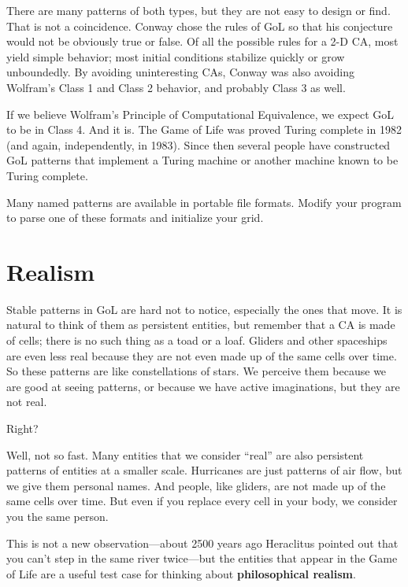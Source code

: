 \documentclass[10pt]{book}
\begin{document}
There are many patterns of both types, but they are not easy to
design or find.  That is not a coincidence.  Conway chose the
rules of GoL so that his conjecture would not be obviously
true or false.  Of all the possible rules for a 2-D CA, most
yield simple behavior; most initial conditions stabilize quickly
or grow unboundedly.  By avoiding uninteresting CAs, Conway
was also avoiding Wolfram's Class 1 and Class 2 behavior, and
probably Class 3 as well.

If we believe Wolfram's Principle of Computational Equivalence, we
expect GoL to be in Class 4.  And it is.  The Game of Life was proved
Turing complete in 1982 (and again, independently, in 1983).
Since then several people have constructed GoL patterns that implement
a Turing machine or another machine known to be Turing complete.

\begin{ex}

Many named patterns are available in portable file formats.
Modify your program to parse one of these formats and initialize
your grid.

\end{ex}



\section{Realism}

Stable patterns in GoL are hard not to notice, especially the ones
that move.  It is natural to think of them as persistent entities, but
remember that a CA is made of cells; there is no such thing as a toad
or a loaf.  Gliders and other spaceships are even less real because
they are not even made up of the same cells over time.  So these
patterns are like constellations of stars.  We perceive them because
we are good at seeing patterns, or because we have active
imaginations, but they are not real.

Right?

Well, not so fast.  Many entities that we consider ``real'' are also
persistent patterns of entities at a smaller scale.  Hurricanes are
just patterns of air flow, but we give them personal names.  And
people, like gliders, are not made up of the same cells over time.
But even if you replace every cell in your body, we consider you the
same person.

This is not a new observation---about 2500 years ago Heraclitus
pointed out that you can't step in the same river twice---but the
entities that appear in the Game of Life are a useful test case for
thinking about {\bf philosophical realism}.
\end{document}
